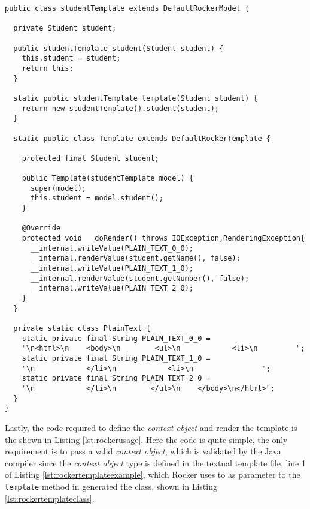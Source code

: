 \begin{minipage}{\linewidth}
\begin{lstlisting}[caption={Rocker Java Class Example}, label={lst:rockertemplateclass}]
public class studentTemplate extends DefaultRockerModel {

  private Student student;

  public studentTemplate student(Student student) {
    this.student = student;
    return this;
  }

  static public studentTemplate template(Student student) {
    return new studentTemplate().student(student);
  }

  static public class Template extends DefaultRockerTemplate {

    protected final Student student;

    public Template(studentTemplate model) {
      super(model);
      this.student = model.student();
    }

    @Override
    protected void __doRender() throws IOException,RenderingException{
      __internal.writeValue(PLAIN_TEXT_0_0);
      __internal.renderValue(student.getName(), false);
      __internal.writeValue(PLAIN_TEXT_1_0);
      __internal.renderValue(student.getNumber(), false);
      __internal.writeValue(PLAIN_TEXT_2_0);
    }
  }

  private static class PlainText {
    static private final String PLAIN_TEXT_0_0 = 
    "\n<html>\n    <body>\n        <ul>\n            <li>\n         ";
    static private final String PLAIN_TEXT_1_0 = 
    "\n            </li>\n            <li>\n                ";
    static private final String PLAIN_TEXT_2_0 = 
    "\n            </li>\n        </ul>\n    </body>\n</html>";
  }
}
\end{lstlisting}
\end{minipage}

\newpage

\noindent
Lastly, the code required to define the \textit{context object} and render the template is the shown in Listing \ref{lst:rockerusage}. Here the code is quite simple, the only requirement is to pass a valid \textit{context object}, which is validated by the Java compiler since the \textit{context object} type is defined in the textual template file, line 1 of Listing \ref{lst:rockertemplateexample}, which Rocker uses to as parameter to the \texttt{template} method in generated the class, shown in Listing \ref{lst:rockertemplateclass}.

\bigskip

